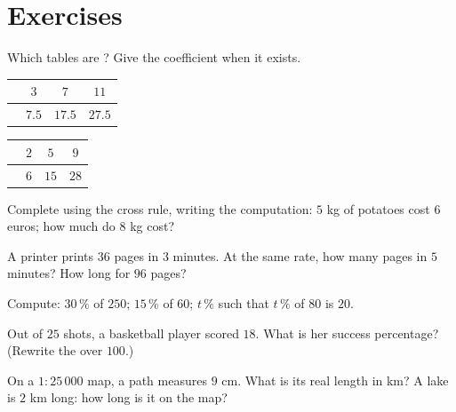 \section{Exercises}

\begin{exercise}[$\star$]\label{exo:g7:prop:1}
Which tables are ? Give the coefficient when it
exists.
\begin{center}
\renewcommand{\arraystretch}{1.2}
\begin{tabular}{l|ccc}
 & $3$ & $7$ & $11$ \\
\hline
 & $7.5$ & $17.5$ & $27.5$ \\
\end{tabular}
\qquad
\begin{tabular}{l|ccc}
 & $2$ & $5$ & $9$ \\
\hline
 & $6$ & $15$ & $28$ \\
\end{tabular}
\end{center}
\end{exercise}

\begin{exercise}[$\star$]\label{exo:g7:prop:2}
Complete using the cross rule, writing the computation:
$5$ kg of potatoes cost $6$ euros; how much do $8$ kg cost?
\end{exercise}

\begin{exercise}[$\star$]\label{exo:g7:prop:3}
A printer prints $36$ pages in $3$ minutes. At the same rate, how many
pages in $5$ minutes? How long for $96$ pages?
\end{exercise}

\begin{exercise}[$\star$]\label{exo:g7:prop:4}
Compute: $30\,\%$ of $250$; \quad $15\,\%$ of $60$; \quad $t\,\%$ such
that $t\,\%$ of $80$ is $20$.
\end{exercise}

\begin{exercise}[$\star$]\label{exo:g7:prop:5}
Out of $25$ shots, a basketball player scored $18$. What is her
success percentage? (Rewrite the  over $100$.)
\end{exercise}

\begin{exercise}[$\star$]\label{exo:g7:prop:6}
On a $1 : 25\,000$ map, a path measures $9$ cm. What is its real
length in km? A lake is $2$ km long: how long is it on the map?
\end{exercise}

